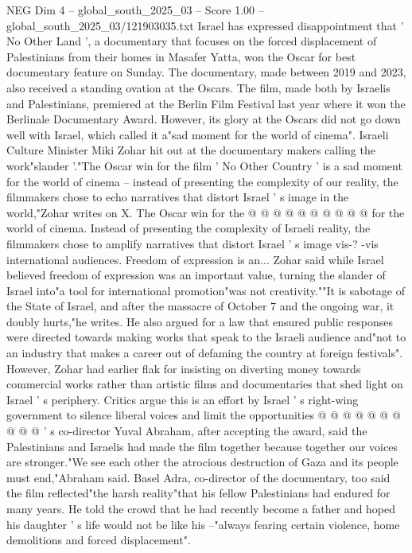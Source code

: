 \begin{textsample}{NEG Dim 4 – global\_south\_2025\_03 – Score 1.00 – global\_south\_2025\_03/121903035.txt}  \label{ex:f4_neg_424}
Israel has expressed disappointment that ' No Other Land ', a documentary that focuses on the forced displacement of Palestinians from their homes in Masafer Yatta, won the Oscar for best documentary feature on Sunday.
The documentary, made between 2019 and 2023, also received a standing ovation at the Oscars.
The film, made both by Israelis and Palestinians, premiered at the Berlin Film Festival last year where it won the Berlinale Documentary Award.
However, its glory at the Oscars did not go down well with Israel, which called it a"sad moment for the world of cinema".
Israeli Culture Minister Miki Zohar hit out at the documentary makers calling the work"slander '."The Oscar win for the film ' No Other Country ' is a sad moment for the world of cinema -- instead of presenting the complexity of our reality, the filmmakers chose to echo narratives that distort Israel ' s image in the world,"Zohar writes on X.
The Oscar win for the @ @ @ @ @ @ @ @ @ @ for the world of cinema.
Instead of presenting the complexity of Israeli reality, the filmmakers chose to amplify narratives that distort Israel ' s image vis-? -vis international audiences.
Freedom of expression is an...
Zohar said while Israel believed freedom of expression was an important value, turning the slander of Israel into"a tool for international promotion"was not creativity.""It is sabotage of the State of Israel, and after the massacre of October 7 and the ongoing war, it doubly hurts,"he writes.
He also argued for a law that ensured public responses were directed towards making works that speak to the Israeli audience and"not to an industry that makes a career out of defaming the country at foreign festivals".
However, Zohar had earlier flak for insisting on diverting money towards commercial works rather than artistic films and documentaries that shed light on Israel ' s periphery.
Critics argue this is an effort by Israel ' s right-wing government to silence liberal voices and limit the opportunities @ @ @ @ @ @ @ @ @ @ ' s co-director Yuval Abraham, after accepting the award, said the Palestinians and Israelis had made the film together because together our voices are stronger."We see each other the atrocious destruction of Gaza and its people must end,"Abraham said.
Basel Adra, co-director of the documentary, too said the film reflected"the harsh reality"that his fellow Palestinians had endured for many years.
He told the crowd that he had recently become a father and hoped his daughter ' s life would not be like his --"always fearing certain violence, home demolitions and forced displacement".

\end{textsample}
